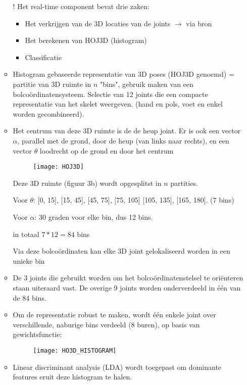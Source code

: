 \begin{itemize}
\begin{itemize}
		{\color{red}! Het real-time component bevat drie zaken:
			\begin{itemize}
				\item Het verkrijgen van de 3D locaties van de joints $\rightarrow$ via bron \cite{real-time-human-pose-recognition-in-parts-from-a-single-depth-image}
				\item Het berekenen van HOJ3D (histogram)
				\item Classificatie
			\end{itemize} }
		\item Histogram gebaseerde representatie van 3D poses (HOJ3D genoemd) = partitie van 3D ruimte in $n$ "bins", gebruik maken van een bolcoördinatensysteem. Selectie van 12 joints die een compacte representatie van het skelet weergeven. (hand en pols, voet en enkel worden gecombineerd).
		\item Het centrum van deze 3D ruimte is de de heup joint. Er is ook een vector $\alpha$, parallel met de grond, door de heup (van links naar rechts), en een vector $\theta$ loodrecht op de grond en door het centrum
			\begin{figure}[ht]
				\centering
			\texttt{[image: HOJ3D]}
			\end{figure}
			Deze 3D ruimte (figuur 3b) wordt opgesplitst in $n$ partities.
			
			Voor $\theta$: [0, 15], [15, 45], [45, 75], [75, 105] [105, 135], [165, 180]. (7 bins)
			
			Voor $\alpha$: 30 graden voor elke bin, dus 12 bins.
			
			in totaal $7 * 12 = 84$ bins
		
			
			Via deze bolcoördinaten kan elke 3D joint gelokaliseerd worden in een unieke bin 
			\item De 3 joints die gebruikt worden om het bolcoördinatenstelsel te oriënteren staan uiteraard vast. De overige 9 joints worden onderverdeeld in één van de 84 bins. 
			
			\item Om de representatie robust te maken, wordt één enkele joint over verschillende, naburige bins verdeeld (8 buren), op basis van gewichtsfunctie:

			
			\begin{figure}[ht]
				\centering
				\texttt{[image: HO3D\_HISTOGRAM]}
			\end{figure}
			
			\item Linear discriminant analysis (LDA) wordt toegepast om dominante features eruit deze histogram te halen.
			

\end{itemize}
\end{itemize}
